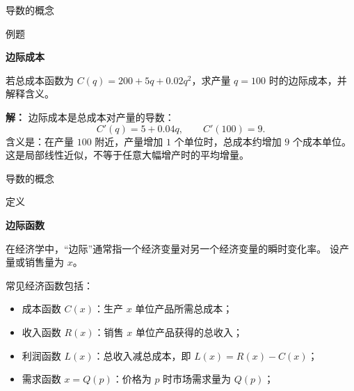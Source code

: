 \documentclass[aspectratio=169,10pt,fontset=fandol]{ctexbeamer}
\begin{document}
\begin{frame}[t,fragile]{导数的概念}
\normalsize
\begin{block}{例题}
{\normalsize
\textbf{边际成本}\par

若总成本函数为 $C(q)=200+5q+0.02q^2$，求产量 $q=100$ 时的边际成本，并解释含义。

}
\end{block}
\pause
{\normalsize
\textbf{解：}
边际成本是总成本对产量的导数：
\[
C'(q)=5+0.04q,\qquad C'(100)=9.
\]
含义是：在产量 $100$ 附近，产量增加 $1$ 个单位时，总成本约增加 $9$ 个成本单位。 这是局部线性近似，不等于任意大幅增产时的平均增量。

}
\end{frame}
\begin{frame}[t,fragile]{导数的概念}
\normalsize
\begin{block}{定义}
{\normalsize
\textbf{边际函数}\par

在经济学中，“边际”通常指一个经济变量对另一个经济变量的瞬时变化率。 设产量或销售量为 $x$。

常见经济函数包括：
\begin{itemize}[leftmargin=2em]
\item 成本函数 $C(x)$：生产 $x$ 单位产品所需总成本；
\item 收入函数 $R(x)$：销售 $x$ 单位产品获得的总收入；
\item 利润函数 $L(x)$：总收入减总成本，即 $L(x)=R(x)-C(x)$；
\item 需求函数 $x=Q(p)$：价格为 $p$ 时市场需求量为 $Q(p)$；

\end{itemize}
}
\end{block}
\end{frame}
\end{document}
